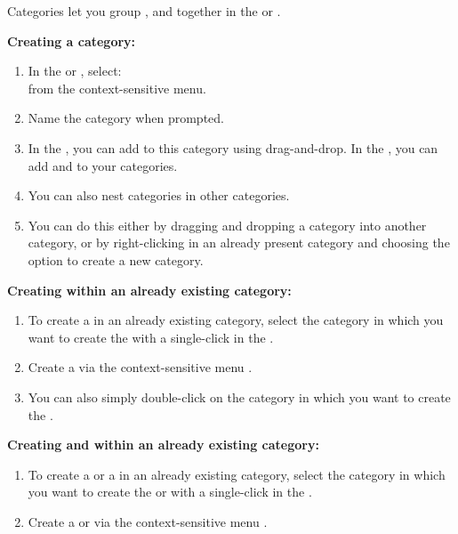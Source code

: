 

Categories let you  group \gdcases{}, \gdsuites{} and \gdjobs{} together in the \gdtestcasebrowser{} or \gdtestsuitebrowser{}. 

\textbf{Creating a category:}
\begin{enumerate}
\item In the \gdtestcasebrowser{} or \gdtestsuitebrowser{}, select:\\
 from the context-sensitive menu. 
\item Name the category when prompted.
\item In the \gdtestcasebrowser{}, you can add \gdcases{} to this category using drag-and-drop. In the \gdtestsuitebrowser{}, you can add \gdsuites{} and \gdjobs{} to your categories.  
\item You can also nest categories in other categories. 
\item You can do this either by dragging and dropping a category into another category, or by right-clicking in an already present category and choosing the option to create a new category. 
\end{enumerate}

\textbf{Creating \gdcases{} within an already existing category:}
\begin{enumerate}
\item To create a \gdcase{} in an already existing category, select the category in which you want to create the \gdcase{} with a single-click in the \gdtestcasebrowser{}. 
\item Create a \gdcase{} via the context-sensitive menu .
\item You can also simply double-click on the category in which you want to create the \gdcase{}. 
\end{enumerate}

\textbf{Creating \gdsuites{} and \gdjobs{} within an already existing category:}
\begin{enumerate}
\item To create a \gdsuite{} or a \gdjob{} in an already existing category, select the category in which you want to create the \gdsuite{} or \gdjob{}  with a single-click in the \gdtestsuitebrowser{}. 
\item Create a \gdsuite{} or \gdjob{} via the context-sensitive menu .
\end{enumerate}
